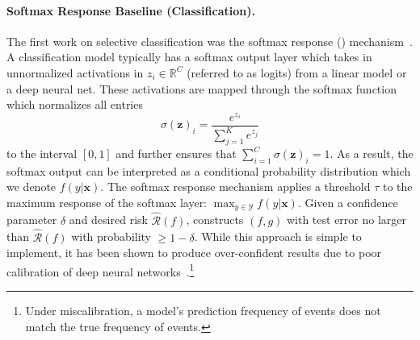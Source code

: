 

\paragraph{Softmax Response Baseline (Classification).} The first work on selective classification was the softmax response (\sr) mechanism~\citep{hendrycks2016baseline, geifman2017selective}. A classification model typically has a softmax output layer which takes in unnormalized activations in $z_{i} \in \mathbb{R}^C$ (referred to as logits) from a linear model or a deep neural net. These activations are mapped through the softmax function which normalizes all entries 
\begin{equation}
    \sigma(\bm{z})_{i}=\frac{e^{z_{i}}}{\sum_{j=1}^{K} e^{z_{j}}}
\end{equation}
to the interval $[0,1]$ and further ensures that $\sum_{i=1}^{C} \sigma(\bm{z})_{i} = 1$. As a result, the softmax output can be interpreted as a conditional probability distribution which we denote $f(y|\bm{x})$.
The softmax response mechanism applies a threshold $\tau$ to the maximum response of the softmax layer: $\max_{y \in \mathcal{Y}}f(y|\bm{x})$. 
Given a confidence parameter $\delta$ and desired risk $\hat{\mathcal{R}}(f)$, \sr constructs $(f, g)$ with test error no larger than $\hat{\mathcal{R}}(f)$ with probability $\geq 1-\delta$. 
While this approach is simple to implement, it has been shown to produce over-confident results due to poor calibration of deep neural networks~\citep{guo2017calibration}.\footnote{Under miscalibration, a model's prediction frequency of events does not match the true frequency of events.} 

